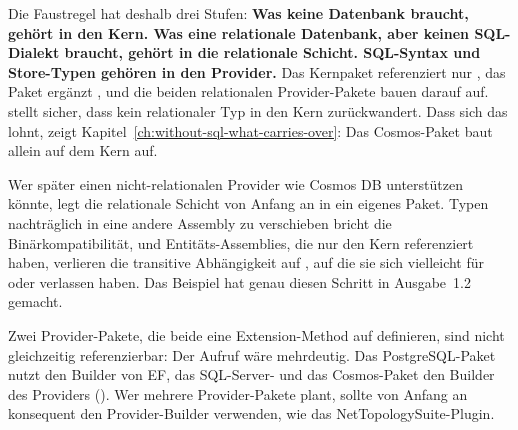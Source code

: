 Die Faustregel hat deshalb drei Stufen: \textbf{Was keine Datenbank braucht, gehört in den
Kern. Was eine relationale Datenbank, aber keinen SQL-Dialekt braucht, gehört in die
relationale Schicht. SQL-Syntax und Store-Typen gehören in den Provider.} Das Kernpaket
referenziert nur ,
das Paket
ergänzt ,
und die beiden relationalen Provider-Pakete bauen darauf auf. 
stellt sicher, dass kein relationaler Typ in den Kern zurückwandert. Dass sich das lohnt, zeigt
Kapitel~\ref{ch:without-sql-what-carries-over}: Das Cosmos-Paket baut allein auf dem Kern auf.

\begin{note}
  Wer später einen nicht-relationalen Provider wie Cosmos DB unterstützen könnte, legt die
  relationale Schicht von Anfang an in ein eigenes Paket. Typen nachträglich in eine andere
  Assembly zu verschieben bricht die Binärkompatibilität, und Entitäts-Assemblies, die nur
  den Kern referenziert haben, verlieren die transitive Abhängigkeit auf
  ,
  auf die sie sich vielleicht für  oder
   verlassen haben. Das Beispiel hat genau diesen
  Schritt in Ausgabe~1.2 gemacht.
\end{note}

\begin{important}
  Zwei Provider-Pakete, die beide eine Extension-Method
   auf
   definieren, sind
  nicht gleichzeitig referenzierbar: Der Aufruf wäre mehrdeutig. Das PostgreSQL-Paket nutzt
  den Builder von EF, das SQL-Server- und das Cosmos-Paket den Builder des Providers
  (). Wer mehrere
  Provider-Pakete plant, sollte von Anfang an konsequent den Provider-Builder verwenden, wie
  das NetTopologySuite-Plugin.
\end{important}

